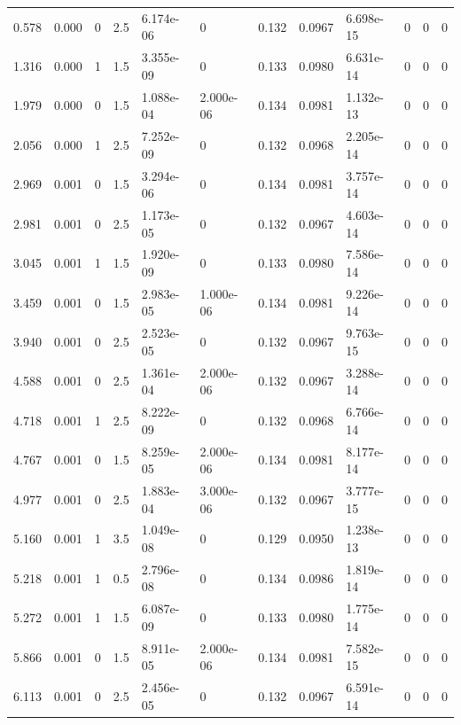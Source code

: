 \documentclass[preview]{standalone}
\begin{document}
{{\begin{tabular}{L{1.2cm}C{1.2cm} C{0.3cm}C{0.5cm} C{1.4cm}C{1.4cm} C{1.4cm}C{1.4cm} C{1.6cm}C{1.6cm} C{1.6cm}C{1.6cm}}
  0.578  &  0.000  & 0     & 2.5 &  6.174e-06  & 0  &  0.132&   0.0967& 6.698e-15 & 0   &  0 & 0  \\ 
  1.316  &  0.000  & 1     & 1.5 &  3.355e-09  & 0  &  0.133&   0.0980& 6.631e-14 & 0   &  0 & 0  \\ 
  1.979  &  0.000  & 0     & 1.5 &  1.088e-04  & 2.000e-06  &  0.134&   0.0981& 1.132e-13 & 0   &  0 & 0  \\ 
  2.056  &  0.000  & 1     & 2.5 &  7.252e-09  & 0  &  0.132&   0.0968& 2.205e-14 & 0   &  0 & 0  \\ 
  2.969  &  0.001  & 0     & 1.5 &  3.294e-06  & 0  &  0.134&   0.0981& 3.757e-14 & 0   &  0 & 0  \\ 
  2.981  &  0.001  & 0     & 2.5 &  1.173e-05  & 0  &  0.132&   0.0967& 4.603e-14 & 0   &  0 & 0  \\ 
  3.045  &  0.001  & 1     & 1.5 &  1.920e-09  & 0  &  0.133&   0.0980& 7.586e-14 & 0   &  0 & 0  \\ 
  3.459  &  0.001  & 0     & 1.5 &  2.983e-05  & 1.000e-06  &  0.134&   0.0981& 9.226e-14 & 0   &  0 & 0  \\ 
  3.940  &  0.001  & 0     & 2.5 &  2.523e-05  & 0  &  0.132&   0.0967& 9.763e-15 & 0   &  0 & 0  \\ 
  4.588  &  0.001  & 0     & 2.5 &  1.361e-04  & 2.000e-06  &  0.132&   0.0967& 3.288e-14 & 0   &  0 & 0  \\ 
  4.718  &  0.001  & 1     & 2.5 &  8.222e-09  & 0  &  0.132&   0.0968& 6.766e-14 & 0   &  0 & 0  \\ 
  4.767  &  0.001  & 0     & 1.5 &  8.259e-05  & 2.000e-06  &  0.134&   0.0981& 8.177e-14 & 0   &  0 & 0  \\ 
  4.977  &  0.001  & 0     & 2.5 &  1.883e-04  & 3.000e-06  &  0.132&   0.0967& 3.777e-15 & 0   &  0 & 0  \\ 
  5.160  &  0.001  & 1     & 3.5 &  1.049e-08  & 0  &  0.129&   0.0950& 1.238e-13 & 0   &  0 & 0  \\ 
  5.218  &  0.001  & 1     & 0.5 &  2.796e-08  & 0  &  0.134&   0.0986& 1.819e-14 & 0   &  0 & 0  \\ 
  5.272  &  0.001  & 1     & 1.5 &  6.087e-09  & 0  &  0.133&   0.0980& 1.775e-14 & 0   &  0 & 0  \\ 
  5.866  &  0.001  & 0     & 1.5 &  8.911e-05  & 2.000e-06  &  0.134&   0.0981& 7.582e-15 & 0   &  0 & 0  \\ 
  6.113  &  0.001  & 0     & 2.5 &  2.456e-05  & 0  &  0.132&   0.0967& 6.591e-14 & 0   &  0 & 0  \\ 

\end{tabular}}}
\end{document}
